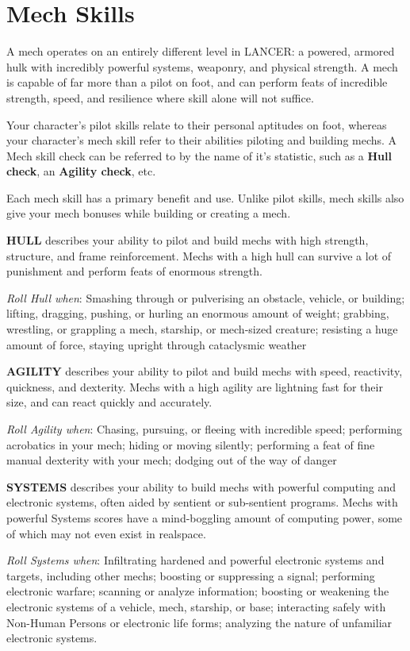 \section{Mech Skills}

A mech operates on an entirely different level in LANCER: a powered, armored hulk with incredibly powerful systems, weaponry, and physical strength. A mech is capable of far more than a pilot on foot, and can perform feats of incredible strength, speed, and resilience where skill alone will not suffice.

Your character's pilot skills relate to their personal aptitudes on foot, whereas your character's mech skill refer to their abilities piloting and building mechs. A Mech skill check can be referred to by the name of it's statistic, such as a \textbf{Hull check}, an \textbf{Agility check}, etc.

Each mech skill has a primary benefit and use. Unlike pilot skills, mech skills also give your mech bonuses while building or creating a mech.

\textbf{HULL} describes your ability to pilot and build mechs with high strength, structure, and frame reinforcement. Mechs with a high hull can survive a lot of punishment and perform feats of enormous strength.

\textit{Roll Hull when}: Smashing through or pulverising an obstacle, vehicle, or building; lifting, dragging, pushing, or hurling an enormous amount of weight; grabbing, wrestling, or grappling a mech, starship, or mech-sized creature; resisting a huge amount of force, staying upright through cataclysmic weather

\textbf{AGILITY} describes your ability to pilot and build mechs with speed, reactivity, quickness, and dexterity. Mechs with a high agility are lightning fast for their size, and can react quickly and accurately.

\textit{Roll Agility when}: Chasing, pursuing, or fleeing with incredible speed; performing acrobatics in your mech; hiding or moving silently; performing a feat of fine manual dexterity with your mech; dodging out of the way of danger

\textbf{SYSTEMS} describes your ability to build mechs with powerful computing and electronic systems, often aided by sentient or sub-sentient programs. Mechs with powerful Systems scores have a mind-boggling amount of computing power, some of which may not even exist in realspace.

\textit{Roll Systems when}: Infiltrating hardened and powerful electronic systems and targets, including other mechs; boosting or suppressing a signal; performing electronic warfare; scanning or analyze information; boosting or weakening the electronic systems of a vehicle, mech, starship, or base; interacting safely with Non-Human Persons or electronic life forms; analyzing the nature of unfamiliar electronic systems. 

